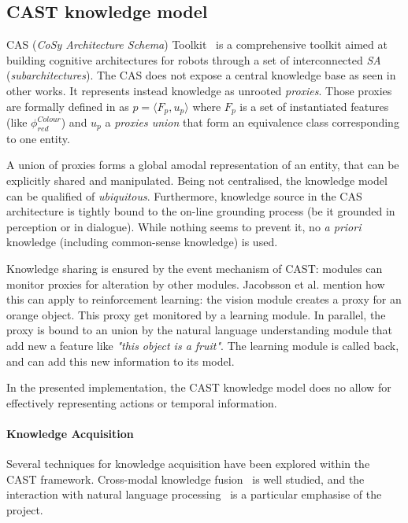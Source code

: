 \documentclass[journal]{IEEEtran}
\begin{document}
\subsection{CAST knowledge model}
\label{sect|cast}

CAS (\emph{CoSy Architecture Schema}) Toolkit~\cite{Hawes2007} is a
comprehensive toolkit aimed at building cognitive architectures for robots
through a set of interconnected \emph{SA} (\emph{subarchitectures}). The CAS
does not expose a central knowledge base as seen in other works. It represents
instead knowledge as unrooted \emph{proxies}. Those proxies are formally
defined in \cite{jacobsson2008crossmodal} as $p= \langle F_p, u_p \rangle$ where $F_p$ is
a set of instantiated features (like $\phi^{Colour}_{red}$) and $u_p$ a
\emph{proxies union} that form an equivalence class corresponding to one
entity.

A union of proxies forms a global amodal representation of an entity, that can
be explicitly shared and manipulated. Being not centralised, the knowledge
model can be qualified of \emph{ubiquitous}. Furthermore, knowledge source in
the CAS architecture is tightly bound to the on-line grounding process (be it
grounded in perception or in dialogue). While nothing seems to prevent it, no
{\it a priori} knowledge (including common-sense knowledge) is used.

Knowledge sharing is ensured by the event mechanism of CAST: modules can
monitor proxies for alteration by other modules. Jacobsson et al. mention how
this can apply to reinforcement learning: the vision module creates a proxy for
an orange object. This proxy get monitored by a learning module. In parallel,
the proxy is bound to an union by the natural language understanding module
that add new a feature like \emph{"this object is a fruit"}. The learning
module is called back, and can add this new information to its model.

In the presented implementation, the CAST knowledge model does no allow for
effectively representing actions or temporal information.

\paragraph{Knowledge Acquisition} Several techniques for knowledge acquisition
have been explored within the CAST framework. Cross-modal knowledge
fusion~\cite{Hawes2007a} is well studied, and the interaction with natural
language processing~\cite{Kruijff2010, Kruijff2010a} is a particular emphasise
of the project.
\end{document}
